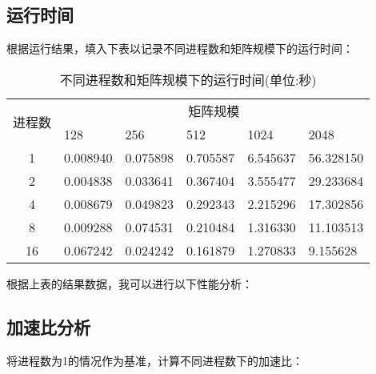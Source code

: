 \documentclass{SYSUReport}
\begin{document}
\subsection{运行时间}
根据运行结果，填入下表以记录不同进程数和矩阵规模下的运行时间：
\begin{table}[H]
\centering
\begin{tabular}{|c|lllll|}
\hline
\multirow{2}{*}{进程数} & \multicolumn{5}{c|}{矩阵规模}                                                                        \\ \cline{2-6} 
 & \multicolumn{1}{l|}{128} & \multicolumn{1}{l|}{256} & \multicolumn{1}{l|}{512} & \multicolumn{1}{l|}{1024} & 2048 \\ \hline
1                    & \multicolumn{1}{l|}{0.008940} & \multicolumn{1}{l|}{0.075898} & \multicolumn{1}{l|}{0.705587} & \multicolumn{1}{l|}{6.545637} & 56.328150 \\ \hline
2                    & \multicolumn{1}{l|}{0.004838} & \multicolumn{1}{l|}{0.033641} & \multicolumn{1}{l|}{0.367404} & \multicolumn{1}{l|}{3.555477} & 29.233684 \\ \hline
4                    & \multicolumn{1}{l|}{0.008679} & \multicolumn{1}{l|}{0.049823} & \multicolumn{1}{l|}{0.292343} & \multicolumn{1}{l|}{2.215296} & 17.302856 \\ \hline
8                    & \multicolumn{1}{l|}{0.009288} & \multicolumn{1}{l|}{0.074531} & \multicolumn{1}{l|}{0.210484} & \multicolumn{1}{l|}{1.316330} & 11.103513 \\ \hline
16                   & \multicolumn{1}{l|}{0.067242} & \multicolumn{1}{l|}{0.024242} & \multicolumn{1}{l|}{0.161879} & \multicolumn{1}{l|}{1.270833} & 9.155628 \\ \hline
\end{tabular}
\caption{不同进程数和矩阵规模下的运行时间(单位:秒)}
\end{table}

根据上表的结果数据，我可以进行以下性能分析：

\subsection{加速比分析}
将进程数为1的情况作为基准，计算不同进程数下的加速比：
\end{document}
